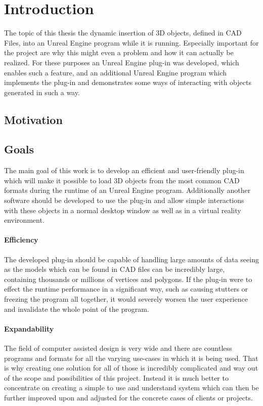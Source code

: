 \chapter{Introduction}
The topic of this thesis the dynamic insertion of 3D objects, defined in CAD Files, into an Unreal Engine program while it is running. Especially important for the project are why this might even a problem and how it can actually be realized. For these purposes an Unreal Engine plug-in was developed, which enables such a feature, and an additional Unreal Engine program which implements the plug-in and demonstrates some ways of interacting with objects generated in such a way.

\section{Motivation}


\section{Goals}\label{chp:Goals}   
The main goal of this work is to develop an efficient and user-friendly plug-in which will make it possible to load 3D objects from the most common CAD formats during the runtime of an Unreal Engine program. Additionally another software should be developed to use the plug-in and allow simple interactions with these objects in a normal desktop window as well as in a virtual reality environment.

\subsubsection{Efficiency} 
The developed plug-in should be capable of handling large amounts of data seeing as the models which can be found in CAD files can be incredibly large, containing thousands or millions of vertices and polygons. If the plug-in were to effect the runtime performance in a significant way, such as causing stutters or freezing the program all together, it would severely worsen the user experience and invalidate the whole point of the program.

\subsubsection{Expandability} 
The field of computer assisted design is very wide and there are countless programs and formats for all the varying use-cases in which it is being used. That is why creating one solution for all of those is incredibly complicated and way out of the scope and possibilities of this project. Instead it is much better to concentrate on creating a simple to use and understand system which can then be further improved upon and adjusted for the concrete cases of clients or projects.

